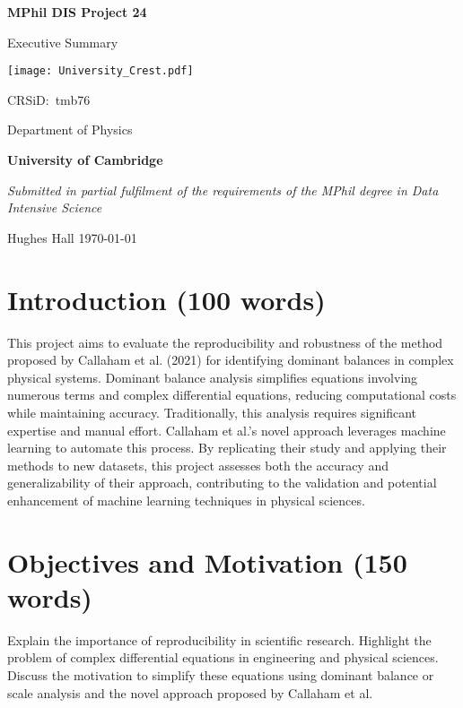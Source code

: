 \documentclass[12pt]{report} %
\begin{document}
\begin{titlepage}
	\centering
	{\LARGE\bfseries MPhil DIS Project 24\par}
	{\LARGE Executive Summary\par}
	\vspace{1cm}
	{\texttt{[image: University\_Crest.pdf]}\par}
	{\Large CRSiD:\ tmb76\par}
	\vspace{1cm}
	{\Large Department of Physics\par}
	{\Large\bfseries University of Cambridge\par}
	\vfill
	{\itshape Submitted in partial fulfilment of the requirements of the MPhil degree in Data Intensive Science}
	\vfill
	{\large Hughes Hall  \hspace{6cm} \today\par}
\end{titlepage}


\tableofcontents


\section{Introduction (100 words)}


This project aims to evaluate the reproducibility and robustness of the method proposed by Callaham et al. (2021)\cite{callaham2021learning} for identifying dominant balances in complex physical systems. Dominant balance analysis simplifies equations involving numerous terms and complex differential equations, reducing computational costs while maintaining accuracy. Traditionally, this analysis requires significant expertise and manual effort. Callaham et al.’s novel approach leverages machine learning to automate this process. By replicating their study and applying their methods to new datasets, this project assesses both the accuracy and generalizability of their approach, contributing to the validation and potential enhancement of machine learning techniques in physical sciences.


\section{Objectives and Motivation (150 words)}

Explain the importance of reproducibility in scientific research.
Highlight the problem of complex differential equations in engineering and physical sciences.
Discuss the motivation to simplify these equations using dominant balance or scale analysis and the novel approach proposed by Callaham et al.
\end{document}
